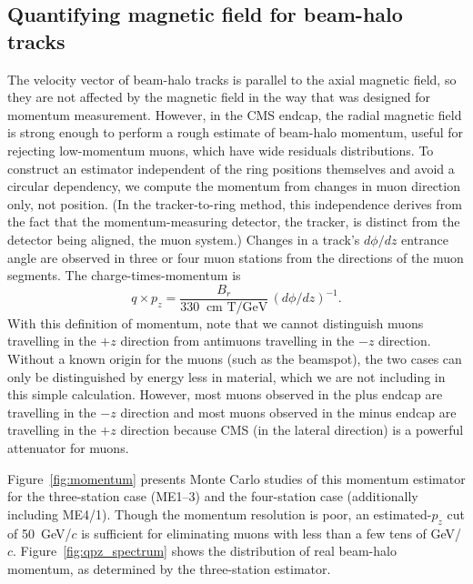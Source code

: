 \documentclass[12pt]{article}
\begin{document}
\subsection{Quantifying magnetic field for beam-halo tracks}

The velocity vector of beam-halo tracks is parallel to the axial
magnetic field, so they are not affected by the magnetic field
in the way that was designed for momentum measurement.  However, in the
CMS endcap, the radial magnetic field is strong enough to perform a
rough estimate of beam-halo momentum, useful for rejecting
low-momentum muons, which have wide residuals distributions.  To
construct an estimator independent of the ring positions themselves
and avoid a circular dependency, we compute the momentum from changes
in muon direction only, not position.  (In the tracker-to-ring method,
this independence derives from the fact that the momentum-measuring
detector, the tracker, is distinct from the detector being aligned,
the muon system.)  Changes in a track's $d\phi/dz$ entrance angle are
observed in three or four muon stations from the directions of the
muon segments.  The charge-times-momentum is
\begin{equation}
q \times p_z = \frac{B_r}{330~\mbox{ cm T/GeV}} \, \left(d\phi/dz\right)^{-1}.
\label{eqn:momentum}
\end{equation}
With this definition of momentum, note that we cannot distinguish
muons travelling in the $+z$ direction from antimuons travelling in
the $-z$ direction.  Without a known origin for the muons (such as the
beamspot), the two cases can only be distinguished by energy less in
material, which we are not including in this simple calculation.
However, most muons observed in the plus endcap are travelling in the
$-z$ direction and most muons observed in the minus endcap are
travelling in the $+z$ direction because CMS (in the lateral
direction) is a powerful attenuator for muons.

Figure~\ref{fig:momentum} presents Monte Carlo studies of this
momentum estimator for the three-station case (ME1--3) and the
four-station case (additionally including ME4/1).  Though the momentum
resolution is poor, an estimated-$p_z$ cut of 50~GeV/$c$ is sufficient
for eliminating muons with less than a few tens of GeV/$c$.
Figure~\ref{fig:qpz_spectrum} shows the distribution of real beam-halo
momentum, as determined by the three-station estimator.
\end{document}
